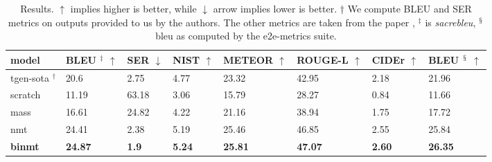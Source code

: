\documentclass[11pt,a4paper]{article}
\begin{document}
\begin{table*}[t]
\begin{tabular}{llllllll}
\hline
model                           & BLEU $^\ddagger$ $\uparrow$     & SER $\downarrow$              & NIST $\uparrow$                & METEOR $\uparrow$               & ROUGE-L $\uparrow$              & CIDEr $\uparrow$               & BLEU $^\mathsection$ $\uparrow$ \\ 
\hline
tgen-sota $^\dagger$            & 20.6                            & 2.75                          & 4.77                           & 23.32                           & 42.95                           & 2.18                           & 21.96                              \\
scratch                         & 11.19                           & 63.18                         & 3.06                           & 15.79                           & 28.27                           & 0.84                           & 11.66                              \\
mass                            & 16.61                           & 24.82                         & 4.22                           & 21.16                           & 38.94                           & 1.75                           & 17.72                              \\
nmt                             & 24.41                           & 2.38                          & 5.19 & 25.46                           & 46.85                           & 2.55                           & 25.84   \\
\textbf{binmt}              & \textbf{24.87}                    & \textbf{1.9}                        & \textbf{5.24} & \textbf{25.81}  & \textbf{47.07}    & \textbf{2.60} & \textbf{26.35}  \\ 
\hline
\end{tabular}
\caption{Results. $\uparrow$ implies higher is better, while $\downarrow$ arrow implies lower is better. $\dagger$ We compute BLEU and SER metrics on outputs provided to us by the authors. The other metrics are taken from the paper \citep{duvsek2019neural},
$^\ddagger$ is \textsl{sacrebleu}, $^\mathsection$ bleu as computed by the e2e-metrics suite.}
\label{results-main}
\end{table*}
\end{document}
